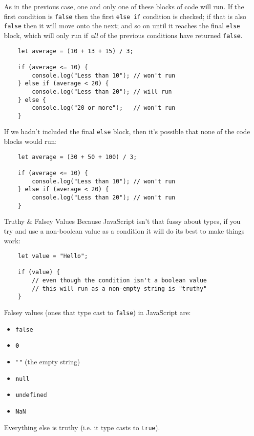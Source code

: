 As in the previous case, one and only one of these blocks of code will run. If the first condition is \texttt{false} then the first \texttt{else if} condition is checked; if that is also \texttt{false} then it will move onto the next; and so on until it reaches the final \texttt{else} block, which will only run if \textit{all} of the previous conditions have returned \texttt{false}.

\begin{verbatim}
    let average = (10 + 13 + 15) / 3;

    if (average <= 10) {
        console.log("Less than 10"); // won't run
    } else if (average < 20) {
        console.log("Less than 20"); // will run
    } else {
        console.log("20 or more");   // won't run
    }
\end{verbatim}

\pagebreak

If we hadn't included the final \texttt{else} block, then it's possible that none of the code blocks would run:

\begin{verbatim}
    let average = (30 + 50 + 100) / 3;

    if (average <= 10) {
        console.log("Less than 10"); // won't run
    } else if (average < 20) {
        console.log("Less than 20"); // won't run
    }
\end{verbatim}


\begin{infobox}{Truthy \& Falsey Values}
    Because JavaScript isn't that fussy about types, if you try and use a non-boolean value as a condition it will do its best to make things work:

    \begin{verbatim}
    let value = "Hello";

    if (value) {
        // even though the condition isn't a boolean value
        // this will run as a non-empty string is "truthy"
    }
    \end{verbatim}

    Falsey values (ones that type cast to \texttt{false}) in JavaScript are:

    \begin{itemize}
        \item \texttt{false}
        \item \texttt{0}
        \item \texttt{""} (the empty string)
        \item \texttt{null}
        \item \texttt{undefined}
        \item \texttt{NaN}
    \end{itemize}

    Everything else is truthy (i.e. it type casts to \texttt{true}).
\end{infobox}

